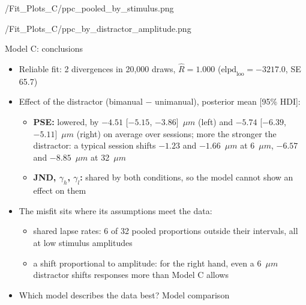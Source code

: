   {\plotsC/Fit_Plots_C/ppc_pooled_by_stimulus.png}

  {\plotsC/Fit_Plots_C/ppc_by_distractor_amplitude.png}

\begin{frame}{Model C: conclusions}
  \small
  \begin{itemize}
    \item Reliable fit: 2 divergences in 20{,}000 draws, $\hat{R} = 1.000$
          ($\text{elpd}_\text{loo} = -3217.0$, SE 65.7)
    \item Effect of the distractor (bimanual $-$ unimanual), posterior mean [95\% HDI]:
    \begin{itemize}
      \item \textbf{PSE:} lowered, by $-4.51$ [$-5.15$, $-3.86$]~$\mu m$ (left) and
            $-5.74$ [$-6.39$, $-5.11$]~$\mu m$ (right) on average over sessions; more the stronger
            the distractor: a typical session shifts $-1.23$ and $-1.66$~$\mu m$ at 6~$\mu m$,
            $-6.57$ and $-8.85$~$\mu m$ at 32~$\mu m$
      \item \textbf{JND, \boldmath$\gamma_h$, \boldmath$\gamma_l$:} shared by both conditions, so
            the model cannot show an effect on them
    \end{itemize}
    \item The misfit sits where its assumptions meet the data:
    \begin{itemize}
      \item shared lapse rates: 6 of 32 pooled proportions outside their intervals, all at low
            stimulus amplitudes
      \item a shift proportional to amplitude: for the right hand, even a 6~$\mu m$ distractor
            shifts responses more than Model C allows
    \end{itemize}
    \item[$\Rightarrow$] Which model describes the data best? Model comparison
  \end{itemize}
\end{frame}
